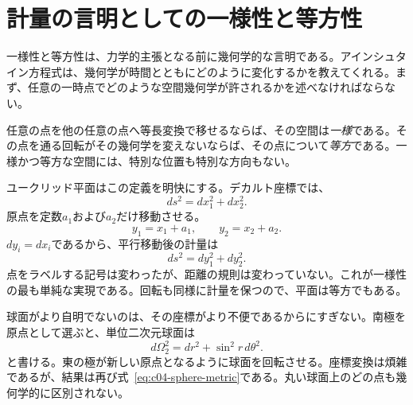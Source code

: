 \section{計量の言明としての一様性と等方性}

一様性と等方性は、力学的主張となる前に幾何学的な言明である。アインシュタイン方程式は、幾何学が時間とともにどのように変化するかを教えてくれる。まず、任意の一時点でどのような空間幾何学が許されるかを述べなければならない。

\begin{classroomqa}
\end{classroomqa}

\begin{definition}
任意の点を他の任意の点へ等長変換で移せるならば、その空間は\emph{一様}である。その点を通る回転がその幾何学を変えないならば、その点について\emph{等方}である。一様かつ等方な空間には、特別な位置も特別な方向もない。
\end{definition}

ユークリッド平面はこの定義を明快にする。デカルト座標では、
\begin{equation}
ds^2=dx_1^2+dx_2^2.
\label{eq:c04-flat-metric}
\end{equation}
原点を定数\(a_1\)および\(a_2\)だけ移動させる。
\begin{equation}
y_1=x_1+a_1,
\qquad
y_2=x_2+a_2.
\label{eq:c04-flat-translation}
\end{equation}
\(dy_i=dx_i\)であるから、平行移動後の計量は
\begin{equation}
ds^2=dy_1^2+dy_2^2.
\end{equation}
点をラベルする記号は変わったが、距離の規則は変わっていない。これが一様性の最も単純な実現である。回転も同様に計量を保つので、平面は等方でもある。

球面がより自明でないのは、その座標がより不便であるからにすぎない。南極を原点として選ぶと、単位二次元球面は
\begin{equation}
d\Omega_2^2=dr^2+\sin^2 r\,d\theta^2.
\label{eq:c04-sphere-metric}
\end{equation}
と書ける。東の極が新しい原点となるように球面を回転させる。座標変換は煩雑であるが、結果は再び式~\eqref{eq:c04-sphere-metric}である。丸い球面上のどの点も幾何学的に区別されない。

